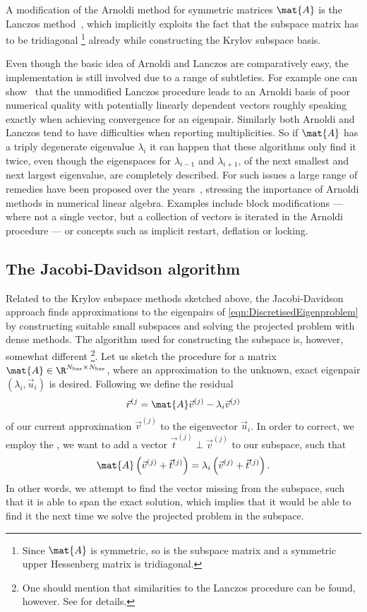 A modification of the Arnoldi method for symmetric matrices $\mat{A}$
is the Lanczos method~\cite{Lanczos1950},
which implicitly exploits the fact
that the subspace matrix has to be tridiagonal%
\footnote{Since $\mat{A}$ is symmetric, so is the subspace matrix
and a symmetric upper Hessenberg matrix is tridiagonal.}
already while constructing the Krylov subspace basis.

Even though the basic idea of Arnoldi and Lanczos are comparatively easy,
the implementation is still involved
due to a range of subtleties.
For example one can show~\cite{Arbenz2010} that the unmodified
Lanczos procedure
leads to an Arnoldi basis of poor numerical quality
with potentially linearly dependent vectors
roughly speaking
exactly when achieving convergence for an eigenpair.
Similarly both Arnoldi and Lanczos tend to have difficulties
when reporting multiplicities.
So if $\mat{A}$ has a triply degenerate eigenvalue $\lambda_i$
it can happen that these algorithms only find it twice,
even though the eigenspaces for $\lambda_{i-1}$
and $\lambda_{i+1}$,
\ie of the next smallest and next largest eigenvalue,
are completely described.
For such issues a large range of remedies have been proposed
over the years~\cite{Arbenz2010,Saad2011},
stressing the importance of Arnoldi methods in numerical linear algebra.
Examples include block modifications ---
where not a single vector, but a collection of vectors is iterated
in the Arnoldi procedure ---
or concepts such as implicit restart, deflation or locking.

\subsection{The Jacobi-Davidson algorithm}
\label{sec:Davidson}
Related to the Krylov subspace methods
sketched above, the Jacobi-Davidson approach
finds approximations to the eigenpairs of \eqref{eqn:DiscretisedEigenproblem}
by constructing suitable small subspaces
and solving the projected problem with dense methods.
The algorithm used for constructing the subspace is, however,
somewhat different%
\footnote{One should mention that similarities to the Lanczos procedure
	can be found, however. See \cite{Arbenz2010} for details.}.
Let us sketch the procedure for a matrix $\mat{A} \in \R^{\Nbas \times \Nbas}$,
where an approximation to the unknown, exact eigenpair $(\lambda_i, \vec{u}_i)$
is desired.
Following \citet{Davidson1975} we define the residual
\begin{equation}
	\vec{r}^{(j} = \mat{A} \vec{v}^{(j)} - \lambda_i \vec{v}^{(j)}
	\label{eqn:DavidsonResidual}
\end{equation}
of our current approximation $\vec{v}^{(j)}$ to the eigenvector $\vec{u}_i$.
In order to correct, we employ the
,
\ie we want to add a vector $\vec{t}^{(j)} \perp \vec{v}^{(j)}$ to our
subspace, such that
\[
	\mat{A} \left(\vec{v}^{(j)} + \vec{t}^{(j)}\right) = \lambda_i \left(\vec{v}^{(j)} + \vec{t}^{(j)}\right).
\]
In other words, we attempt to find the vector missing from the subspace,
such that it is able to span the exact solution,
which implies that it would be able to find it the next time
we solve the projected problem in the subspace.


